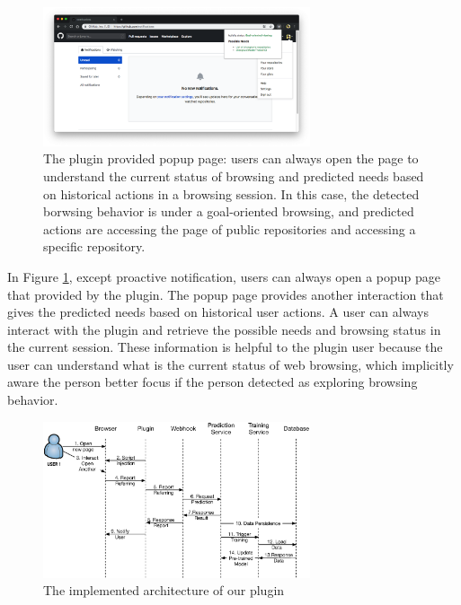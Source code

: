 \begin{figure}[H]
    \centering
    \includegraphics[width=0.7\textwidth]{figures/plugin-predicting-result}
    \caption{The plugin provided popup page: users can always open the page
    to understand the current status of browsing and predicted needs based on
    historical actions in a browsing session. In this case, the detected borwsing behavior
    is under a goal-oriented browsing, and predicted actions
    are accessing the page of public repositories and accessing a specific repository.}
    \label{fig:plugin-predict}
\end{figure}

In Figure \ref{fig:plugin-predict}, except proactive notification, 
users can always open a popup page that provided by the plugin.
The popup page provides another interaction that gives the predicted needs 
based on historical user actions. A user can always interact with the plugin and
retrieve the possible needs and browsing status in the current session.
These information is helpful to the plugin user because the user can understand
what is the current status of web browsing, which implicitly aware the person better focus
if the person detected as exploring browsing behavior.

\begin{figure}[H]
    \centering
    \includegraphics[width=0.7\textwidth]{figures/arch}
    \caption{The implemented architecture of our plugin}
    \label{fig:arch}
\end{figure}

